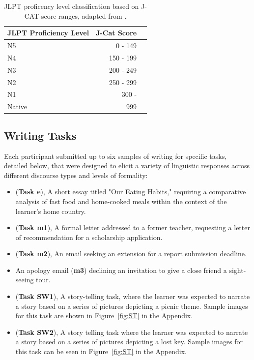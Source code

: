\begin{table}[h!]
\centering
\begin{tabular}{lrl}
\hline \textbf{JLPT Proficiency Level} & \textbf{J-Cat Score}  \\ \hline
N5 & 0 - 149 \\
N4 & 150 - 199 \\
N3 & 200 - 249 \\
N2 & 250 - 299 \\
N1 & 300 - \\
Native & 999\\
\hline
\end{tabular}
\caption[J-CAT score ranges to their equivalent JLPT Level]{JLPT proficency level classification based on J-CAT score ranges, adapted from
\citet{jcat_interpretation_guide}.}
\label{tab:proficency-table}
\end{table}

\subsection{Writing Tasks}

Each participant submitted up to six samples of writing for specific tasks, detailed below, that were designed to
elicit a variety of linguistic responses across different discourse types and levels of formality:
\begin{itemize}
    \item (\textbf{Task e}), A short essay titled "Our Eating Habits," requiring a comparative analysis of fast food
    and home-cooked
    meals within the context of the learner's home country.
    \item (\textbf{Task m1}), A formal letter addressed to a former teacher, requesting a letter of recommendation
    for a scholarship
    application.
    \item (\textbf{Task m2}), An email seeking an extension for a report submission deadline.
    \item An apology email (\textbf{m3}) declining an invitation to give a close friend a sight-seeing tour.
    \item (\textbf{Task SW1}), A story-telling task, where the learner was expected to narrate a story based on a
    series of pictures depicting a picnic theme. Sample images for this task are shown in Figure~\ref{fig:ST}
    in the Appendix.
    \item (\textbf{Task SW2}), A story telling task where the learner was expected to narrate a story based on a
    series of pictures depicting a lost key. Sample images for this task can be seen in Figure~\ref{fig:ST} in the
    Appendix.
\end{itemize}

